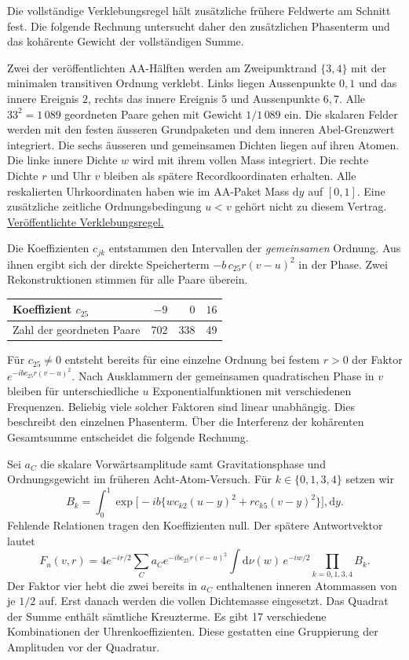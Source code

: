 \documentclass[12pt,a4paper]{article}
\newcommand{\titleline}[1]{{\LARGE\bfseries #1}\par\vspace{5pt}}
\newcommand{\repo}{https://github.com/thomasmgfeller/x6-spectral-astrolabium/blob/f461985f67aa0c1aef972d529a9b09575fe8df77/research/rax_cqg/dust_collapse}
\newcommand{\dd}{\mathrm{d}}
\begin{document}
Die vollständige Verklebungsregel hält zusätzliche frühere Feldwerte am Schnitt fest. Die folgende Rechnung untersucht daher den zusätzlichen Phasenterm und das kohärente Gewicht der vollständigen Summe.

\newpage\titleline{Was die gemeinsame Wirkung weiterträgt}
Zwei der veröffentlichten AA-Hälften werden am Zweipunktrand $\{3,4\}$ mit der minimalen transitiven Ordnung verklebt. Links liegen Aussenpunkte $0,1$ und das innere Ereignis $2$, rechts das innere Ereignis $5$ und Aussenpunkte $6,7$. Alle $33^2=1\,089$ geordneten Paare gehen mit Gewicht $1/1\,089$ ein. Die skalaren Felder werden mit den festen äusseren Grundpaketen und dem inneren Abel-Grenzwert integriert. Die sechs äusseren und gemeinsamen Dichten liegen auf ihren Atomen. Die linke innere Dichte $w$ wird mit ihrem vollen Mass integriert. Die rechte Dichte $r$ und Uhr $v$ bleiben als spätere Recordkoordinaten erhalten. Alle reskalierten Uhrkoordinaten haben wie im AA-Paket Mass $\dd y$ auf $[0,1]$. Eine zusätzliche zeitliche Ordnungsbedingung $u<v$ gehört nicht zu diesem Vertrag. \href{\repo/extended_sewing_v0_1/README.md}{Veröffentlichte Verklebungsregel.}

Die Koeffizienten $c_{jk}$ entstammen den Intervallen der \emph{gemeinsamen} Ordnung. Aus ihnen ergibt sich der direkte Speicherterm $-b\,c_{25}r(v-u)^2$ in der Phase. Zwei Rekonstruktionen stimmen für alle Paare überein.
\begin{center}\begin{tabular}{@{}lrrr@{}}\toprule
Koeffizient $c_{25}$ & $-9$ & $0$ & $16$\\\midrule
Zahl der geordneten Paare & 702 & 338 & 49\\\bottomrule\end{tabular}\end{center}
Für $c_{25}\ne0$ entsteht bereits für eine einzelne Ordnung bei festem $r>0$ der Faktor $e^{-ibc_{25}r(v-u)^2}$. Nach Ausklammern der gemeinsamen quadratischen Phase in $v$ bleiben für unterschiedliche $u$ Exponentialfunktionen mit verschiedenen Frequenzen. Beliebig viele solcher Faktoren sind linear unabhängig. Dies beschreibt den einzelnen Phasenterm. Über die Interferenz der kohärenten Gesamtsumme entscheidet die folgende Rechnung.

Sei $a_C$ die skalare Vorwärtsamplitude samt Gravitationsphase und Ordnungsgewicht im früheren Acht-Atom-Versuch. Für $k\in\{0,1,3,4\}$ setzen wir
\[
 B_k=\int_0^1\exp\!\big[-ib\{w c_{k2}(u-y)^2+
                                  r c_{k5}(v-y)^2\}\big],\dd y.
\]
Fehlende Relationen tragen den Koeffizienten null. Der spätere Antwortvektor lautet
\[
 F_u(v,r)=4e^{-ir/2}\sum_C a_C e^{-ib c_{25}r(v-u)^2}
             \int\dd\nu(w)\,e^{-iw/2}\prod_{k=0,1,3,4}B_k .
\]
Der Faktor vier hebt die zwei bereits in $a_C$ enthaltenen inneren Atommassen von je $1/2$ auf. Erst danach werden die vollen Dichtemasse eingesetzt. Das Quadrat der Summe enthält sämtliche Kreuzterme. Es gibt 17 verschiedene Kombinationen der Uhrenkoeffizienten. Diese gestatten eine Gruppierung der Amplituden vor der Quadratur.
\end{document}

